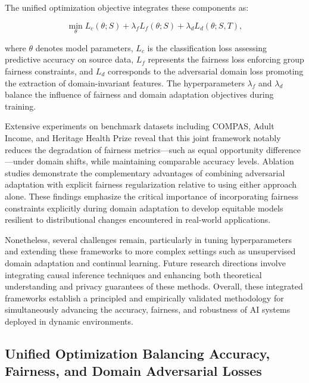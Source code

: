 \documentclass[sigconf]{acmart}
\begin{document}
The unified optimization objective integrates these components as:

\[
\min_{\theta} L_c(\theta; S) + \lambda_f L_f(\theta; S) + \lambda_d L_d(\theta; S, T),
\]

where \(\theta\) denotes model parameters, \(L_c\) is the classification loss assessing predictive accuracy on source data, \(L_f\) represents the fairness loss enforcing group fairness constraints, and \(L_d\) corresponds to the adversarial domain loss promoting the extraction of domain-invariant features. The hyperparameters \(\lambda_f\) and \(\lambda_d\) balance the influence of fairness and domain adaptation objectives during training.

Extensive experiments on benchmark datasets including COMPAS, Adult Income, and Heritage Health Prize reveal that this joint framework notably reduces the degradation of fairness metrics—such as equal opportunity difference—under domain shifts, while maintaining comparable accuracy levels. Ablation studies demonstrate the complementary advantages of combining adversarial adaptation with explicit fairness regularization relative to using either approach alone. These findings emphasize the critical importance of incorporating fairness constraints explicitly during domain adaptation to develop equitable models resilient to distributional changes encountered in real-world applications.

Nonetheless, several challenges remain, particularly in tuning hyperparameters and extending these frameworks to more complex settings such as unsupervised domain adaptation and continual learning. Future research directions involve integrating causal inference techniques and enhancing both theoretical understanding and privacy guarantees of these methods. Overall, these integrated frameworks establish a principled and empirically validated methodology for simultaneously advancing the accuracy, fairness, and robustness of AI systems deployed in dynamic environments.

\subsection{Unified Optimization Balancing Accuracy, Fairness, and Domain Adversarial Losses}
\end{document}
